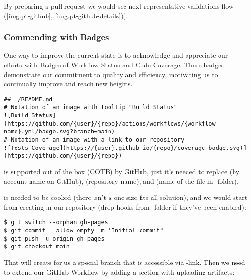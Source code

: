 \noindent By preparing a pull-request we would see next representative validations flow
(\cref{img:pt-github}, \cref{img:pt-github-details})):




\subsubsection{Commending with Badges} \label{a-badges}

One way to improve the current state is to acknowledge and appreciate our efforts with Badges of Workflow Status and 
Code Coverage. These badges demonstrate our commitment to quality and efficiency, motivating us to continually improve 
and reach new heights.

\begin{lstlisting}[language=terminal]
## ./README.md
# Notation of an image with tooltip "Build Status"
![Build Status](https://github.com/{user}/{repo}/actions/workflows/{workflow-name}.yml/badge.svg?branch=main)
# Notation of an image with a link to our repository
![Tests Coverage](https://{user}.github.io/{repo}/coverage_badge.svg)](https://github.com/{user}/{repo})
\end{lstlisting}

\noindent {} is supported out of the box (OOTB) by GitHub, just it's needed to replace  
(by account name on GitHub),  (repository name), and  (name of the file in 
-folder).

 is needed to be cooked (there isn't a one-size-fits-all solution), and we would start from creating 
 in our repository (drop hooks from -folder if they've been enabled):

\begin{lstlisting}[language=terminal]
$ git switch --orphan gh-pages
$ git commit --allow-empty -m "Initial commit"
$ git push -u origin gh-pages
$ git checkout main
\end{lstlisting}

\noindent That will create for us a special branch that is accessible via -link.
Then we need to extend our GitHub Workflow by adding a section with uploading artifacts:

